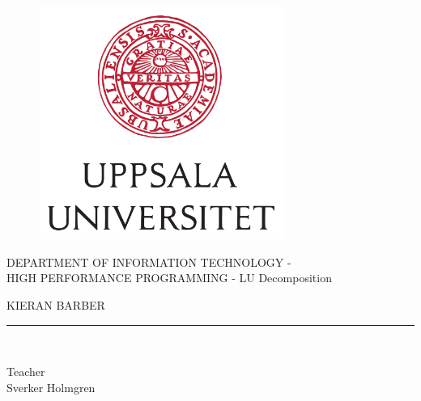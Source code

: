 \begin{titlepage}
  \begin{center}
      \vspace*{-1in}
      \begin{figure}[htb]
          \begin{center}
              \includegraphics[width=8cm]{../images/UU_logo.jpg}
          \end{center}
      \end{figure}

      DEPARTMENT OF INFORMATION TECHNOLOGY - \@date\\
      \vspace*{0.15in}
      HIGH PERFORMANCE PROGRAMMING - LU Decomposition\\
      \vspace*{0.3in}
      \begin{large}
          KIERAN BARBER\\
      \end{large}
      \vspace*{0.1in}
      \rule{80mm}{0.1mm}\\
      \vspace*{0.1in}
      \begin{large}
          Teacher \\
          Sverker Holmgren
      \end{large}
  \end{center}
\end{titlepage}
